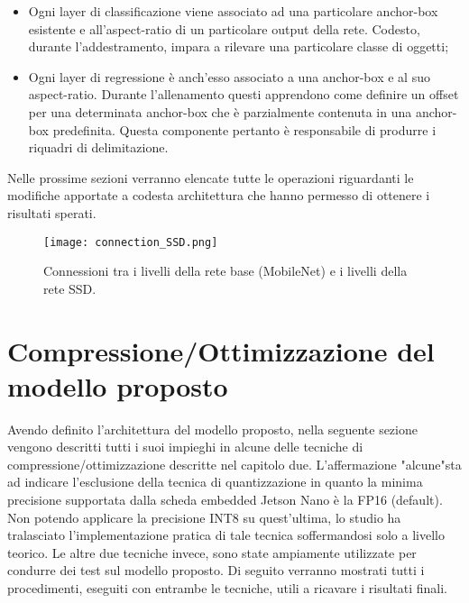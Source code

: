 \begin{itemize}
    \item Ogni layer di classificazione viene associato ad una particolare anchor-box esistente e all'aspect-ratio di un particolare output della rete. Codesto, durante l'addestramento, impara a rilevare una particolare classe di oggetti;
    \item Ogni layer di regressione è anch'esso associato a una anchor-box e al suo aspect-ratio. Durante l'allenamento questi apprendono come definire un offset per una determinata anchor-box che è parzialmente contenuta in una anchor-box predefinita. Questa componente pertanto è responsabile di produrre i riquadri di delimitazione.
\end{itemize}
Nelle prossime sezioni verranno elencate tutte le operazioni riguardanti le modifiche apportate a codesta architettura che hanno permesso di ottenere i risultati sperati.
\begin{figure}
    \centering
    \texttt{[image: connection\_SSD.png]}
    \centering
    \caption{Connessioni tra i livelli della rete base (MobileNet) e i livelli della rete SSD.}
    \label{SSD_conn}
\end{figure}

\section{Compressione/Ottimizzazione del modello proposto}
Avendo definito l'architettura del modello proposto, nella seguente sezione vengono descritti tutti i suoi impieghi in alcune delle tecniche di compressione/ottimizzazione descritte nel capitolo due. L'affermazione "alcune"sta ad indicare l'esclusione della tecnica di quantizzazione in quanto la minima precisione supportata dalla scheda embedded Jetson Nano è la FP16 (default). Non potendo applicare la precisione INT8 su quest'ultima, lo studio ha tralasciato l'implementazione pratica di tale tecnica soffermandosi solo a livello teorico. Le altre due tecniche invece, sono state ampiamente utilizzate per condurre dei test sul modello proposto. Di seguito verranno mostrati tutti i procedimenti, eseguiti con entrambe le tecniche, utili a ricavare i risultati finali.

